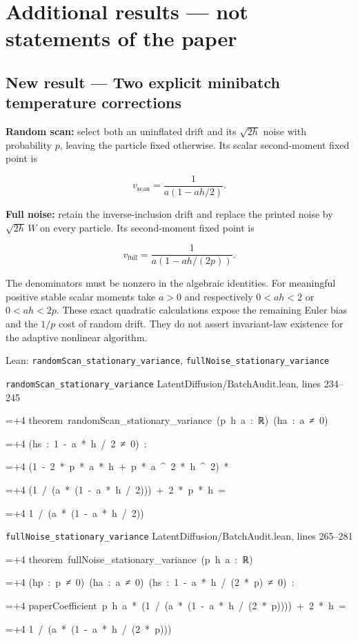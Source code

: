 \documentclass[11pt,a4paper]{report}
\newlength{\leancharwidth}
\newenvironment{leancode}{\par\smallskip\begingroup\ttfamily\footnotesize\raggedright
  \settowidth{\leancharwidth}{M}\setlength{\parskip}{0pt}\setlength{\parindent}{0pt}
  \frenchspacing}{\par\endgroup\smallskip}
\newcommand{\leanline}[2]{\hangindent=\dimexpr#1\leancharwidth+4\leancharwidth\relax
  \hangafter=1\noindent\hspace*{#1\leancharwidth}#2\par}
\newcommand{\leansource}[1]{\par{\footnotesize\color{leanmuted}#1}\par}
\begin{document}
\section{Additional results — not statements of the paper}
\subsection{\texorpdfstring{New result — Two explicit minibatch temperature corrections}{New result — Two explicit minibatch temperature corrections}}



\textbf{Random scan:} select both an uninflated drift and its \(\sqrt{2h}\) noise with probability \(p\), leaving the particle fixed otherwise. Its scalar second-moment fixed point is



\[v_{\mathrm{scan}}=\frac1{a(1-ah/2)}.\]



\textbf{Full noise:} retain the inverse-inclusion drift and replace the printed noise by \(\sqrt{2h}\,W\) on every particle. Its second-moment fixed point is



\[v_{\mathrm{full}}=\frac1{a(1-ah/(2p))}.\]



The denominators must be nonzero in the algebraic identities. For meaningful positive stable scalar moments take \(a>0\) and respectively \(0<ah<2\) or \(0<ah<2p\). These exact quadratic calculations expose the remaining Euler bias and the \(1/p\) cost of random drift. They do not assert invariant-law existence for the adaptive nonlinear algorithm.

\begin{leanbox}{Lean: \texttt{randomScan\_\allowbreak{}stationary\_\allowbreak{}variance}, \texttt{fullNoise\_\allowbreak{}stationary\_\allowbreak{}variance}}
\leansource{\texttt{randomScan\_\allowbreak{}stationary\_\allowbreak{}variance} \quad LatentDiffusion/\allowbreak{}BatchAudit.lean, lines 234–245}
\begin{leancode}
\leanline{0}{theorem\ randomScan\_stationary\_variance\ (p\ h\ a\ :\ ℝ)\ (ha\ :\ a\ ≠\ 0)}
\leanline{4}{(hs\ :\ 1\ -\ a\ *\ h\ /\ 2\ ≠\ 0)\ :}
\leanline{4}{(1\ -\ 2\ *\ p\ *\ a\ *\ h\ +\ p\ *\ a\ \textasciicircum{}\ 2\ *\ h\ \textasciicircum{}\ 2)\ *}
\leanline{8}{(1\ /\ (a\ *\ (1\ -\ a\ *\ h\ /\ 2)))\ +\ 2\ *\ p\ *\ h\ =}
\leanline{6}{1\ /\ (a\ *\ (1\ -\ a\ *\ h\ /\ 2))}
\end{leancode}
\leansource{\texttt{fullNoise\_\allowbreak{}stationary\_\allowbreak{}variance} \quad LatentDiffusion/\allowbreak{}BatchAudit.lean, lines 265–281}
\begin{leancode}
\leanline{0}{theorem\ fullNoise\_stationary\_variance\ (p\ h\ a\ :\ ℝ)}
\leanline{4}{(hp\ :\ p\ ≠\ 0)\ (ha\ :\ a\ ≠\ 0)\ (hs\ :\ 1\ -\ a\ *\ h\ /\ (2\ *\ p)\ ≠\ 0)\ :}
\leanline{4}{paperCoefficient\ p\ h\ a\ *\ (1\ /\ (a\ *\ (1\ -\ a\ *\ h\ /\ (2\ *\ p))))\ +\ 2\ *\ h\ =}
\leanline{6}{1\ /\ (a\ *\ (1\ -\ a\ *\ h\ /\ (2\ *\ p)))}
\end{leancode}
\end{leanbox}
\end{document}
